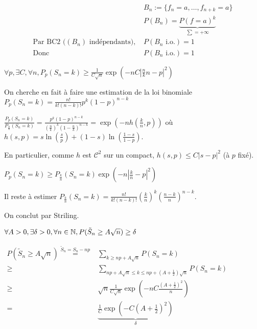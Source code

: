 \documentclass[10pt,a4paper,notitlepage ]{report}
\begin{document}
\begin{demo}
	\begin{align*}
		&B_n := \{f_n=a, \dots, f_{n+k}=a\} \\
		&P(B_n) =\underset {\sum = +\infty} {\underbrace{P(f=a)^k}} \\
		\text{Par BC2 ($(B_n)$ indépendants), } &P(B_n \text{ i.o.}) = 1 \\
		\text{Donc } &P(B_n \text{ i.o.}) = 1
	\end{align*}
\end{demo}

\begin{lemme}
	$\forall p, \exists C, \forall n, P_p(S_n=k)\ge \frac 1 {C\sqrt n} \exp{\left( -nC\left| \frac nk n -p\right|^2 \right)}$
\end{lemme}

\begin{demo}
	On cherche en fait à faire une estimation de la loi binomiale $P_p(S_n=k) = \frac{n!}{k!(n-k)!} p^k (1-p)^{n-k}$
	
	$\frac{P_p(S_n=k)}{P_{\frac n k}(S_n=k)} = \frac{p^k(1-p)^{n-k}}{\left(\frac n k\right)^k \left(1- \frac n k\right)^{n-k}} = \exp{\left( -nh\left(\frac k n, p\right)\right)}$ où $h(s,p) = s\ln\left(\frac s p \right) +(1-s)\ln\left(\frac{1-s}{1-p}\right)$.
	
	En particulier, comme $h$ est $\mathcal C^2$ sur un compact, $h(s,p) \le C|s-p|^2$ (à $p$ fixé).
	
	$P_p(S_n=k) \ge P_{\frac k n}(S_n=k)\exp\left( -n \left| \frac k n -p\right|^2\right)$
	
	Il reste à estimer $P_{\frac k n}(S_n=k) = \frac{n!}{k!(n-k)!}\left(\frac k n\right)^k \left( \frac {n-k} n \right)^{n-k}$.
	
	On conclut par Striling.
\end{demo}

\begin{propriete}
	$\forall A > 0, \exists \delta > 0, \forall n\in\mathbb N, P(\tilde S_n \ge A\sqrt n) \ge \delta$
\end{propriete}

\begin{demo}
	
	$\begin{aligned}
	P(\tilde S_n \ge A\sqrt n) \overset {\tilde S_n = S_n - np} =& \underset{k\ge np + A\sqrt n} \sum P(S_n=k) \\
	\ge & \underset{np + A\sqrt n \le k \le np +(A+\frac 1 2) \sqrt n} \sum P(S_n=k) \\
	\ge & \sqrt n \frac 1 {C\sqrt n} \exp \left(-nC \frac {(A+\frac 1 2)^2} n \right) \\
	=& \underset{\delta} {\underbrace{\frac 1 C \exp\left( -C(A + \frac 1 2)^2 \right)}}
	\end{aligned}$
\end{demo}
\end{document}
